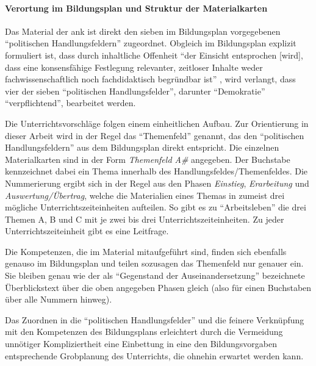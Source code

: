 
\paragraph{Verortung im Bildungsplan und Struktur der Materialkarten}
Das Material der \gls{ank} ist direkt den sieben im Bildungsplan vorgegebenen \enquote{politischen Handlungsfeldern} \autocite[3, 15]{bplan} zugeordnet.
Obgleich im Bildungsplan explizit formuliert ist, dass durch inhaltliche Offenheit \enquote{der Einsicht entsprochen [wird], dass eine konsensfähige Festlegung relevanter, zeitloser Inhalte weder fachwissenschaftlich noch fachdidaktisch begründbar ist} \autocite[15]{bplan}, wird verlangt, dass vier der sieben \enquote{politischen Handlungsfelder}, darunter \enquote{Demokratie} \enquote{verpflichtend}, bearbeitet werden.

Die Unterrichtsvorschläge folgen einem einheitlichen Aufbau. Zur Orientierung in dieser Arbeit wird in der Regel das \enquote{Themenfeld} genannt, das den \enquote{politischen Handlungsfeldern} aus dem Bildungsplan direkt entspricht. 
Die einzelnen Materialkarten sind in der Form \emph{Themenfeld A\#} angegeben. 
Der Buchstabe kennzeichnet dabei ein Thema innerhalb des Handlungsfeldes/Themenfeldes.
Die Nummerierung ergibt sich in der Regel aus den Phasen \emph{Einstieg}, \emph{Erarbeitung} und \emph{Auswertung/Übertrag}, welche die Materialien eines Themas in zumeist drei mögliche Unterrichtszeiteinheiten aufteilen. So gibt es zu \enquote{Arbeitsleben} die drei Themen A, B und C mit je zwei bis drei Unterrichtszeiteinheiten.
Zu jeder Unterrichtszeiteinheit gibt es eine Leitfrage. %

Die Kompetenzen, die im Material mitaufgeführt sind, finden sich ebenfalls genauso im Bildungsplan und teilen sozusagen das Themenfeld nur genauer ein. Sie bleiben genau wie der als \enquote{Gegenstand der Auseinandersetzung} bezeichnete Überblickstext über die oben angegeben Phasen gleich (also für einen Buchstaben über alle Nummern hinweg). 

Das Zuordnen in die \enquote{politischen Handlungsfelder} und die feinere Verknüpfung mit den Kompetenzen des Bildungsplans erleichtert durch die Vermeidung unnötiger Kompliziertheit eine Einbettung in eine den Bildungsvorgaben entsprechende Grobplanung des Unterrichts, die ohnehin erwartet werden kann.


